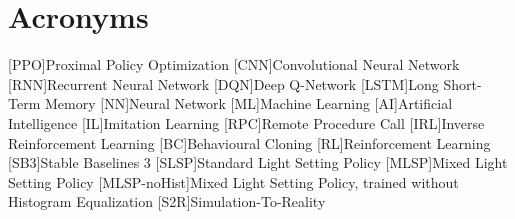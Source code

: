 \chapter*{Acronyms}

\begin{acronym}
    [PPO]{Proximal Policy Optimization}
    [CNN]{Convolutional Neural Network}
    [RNN]{Recurrent Neural Network}
    [DQN]{Deep Q-Network}
    [LSTM]{Long Short-Term Memory}
    [NN]{Neural Network}
    [ML]{Machine Learning}
    [AI]{Artificial Intelligence}
    [IL]{Imitation Learning}
    [RPC]{Remote Procedure Call}
    [IRL]{Inverse Reinforcement Learning}
    [BC]{Behavioural Cloning}
    [RL]{Reinforcement Learning}
    [SB3]{Stable Baselines 3}
    [SLSP]{Standard Light Setting Policy}
    [MLSP]{Mixed Light Setting Policy} %
    [MLSP-noHist]{Mixed Light Setting Policy, trained without Histogram Equalization}
    [S2R]{Simulation-To-Reality}
\end{acronym}



